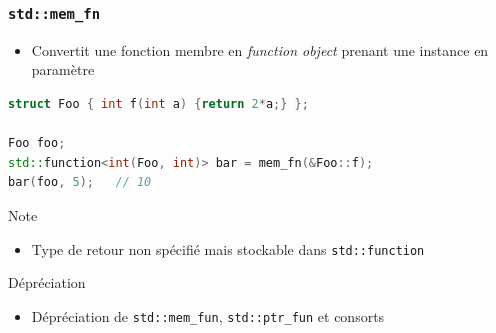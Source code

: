 \documentclass[C++.tex]{subfiles}
\begin{document}
\begin{frame}[fragile]
	\frametitle{\lstinline|std::mem_fn|}
	\begin{itemize}
		\item Convertit une fonction membre en \textit{function object} prenant une instance en paramètre
	\end{itemize}

	\begin{lstlisting}[language=C++]
struct Foo { int f(int a) {return 2*a;} };

Foo foo;
std::function<int(Foo, int)> bar = mem_fn(&Foo::f);
bar(foo, 5);   // 10\end{lstlisting}

	\begin{block}{Note}
		\begin{itemize}
			\item Type de retour non spécifié mais stockable dans \lstinline|std::function|
		\end{itemize}
	\end{block}

	\begin{block}{Dépréciation}
		\begin{itemize}
			\item Dépréciation de \lstinline|std::mem_fun|, \lstinline|std::ptr_fun| et consorts
		\end{itemize}

	\end{block}
\end{frame}
\end{document}
